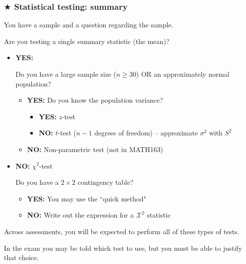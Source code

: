 \documentclass[t,8pt]{beamer}
\begin{document}
\begin{frame}
	\frametitle{$\bigstar$ Statistical testing: summary} 
	You have a sample and a question regarding the sample. \par
	Are you testing a single summary statistic (the mean)?
	\begin{itemize}
		\item {\bf YES:} \par
		Do you have a large sample size ($n\geq 30$) OR an approximately normal population?
		\begin{itemize}
			\item {\bf YES:} 
			Do you know the population variance?
			\begin{itemize}
				\item {\bf YES:} $z$-test
				\item {\bf NO:} $t$-test ($n-1$ degrees of freedom) – approximate $\sigma^2$ with $S^2$
			\end{itemize}
			\item {\bf NO:} Non-parametric test (not in MATH163)
		\end{itemize}
		\item {\bf NO:} $\chi^2$-test \par
		Do you have a $2\times 2$ contingency table?
		\begin{itemize}
			\item {\bf YES:} You may use the ``quick method"
			\item {\bf NO:} Write out the expression for a $\mathcal{X}^2$ statistic
		\end{itemize}
	\end{itemize}
	Across assessments, you will be expected to perform all of these types of tests. \par
	{\small\color{NavyBlue} In the exam you may be told which test to use, but you must be able to justify that choice.}
\end{frame}

\end{document}
